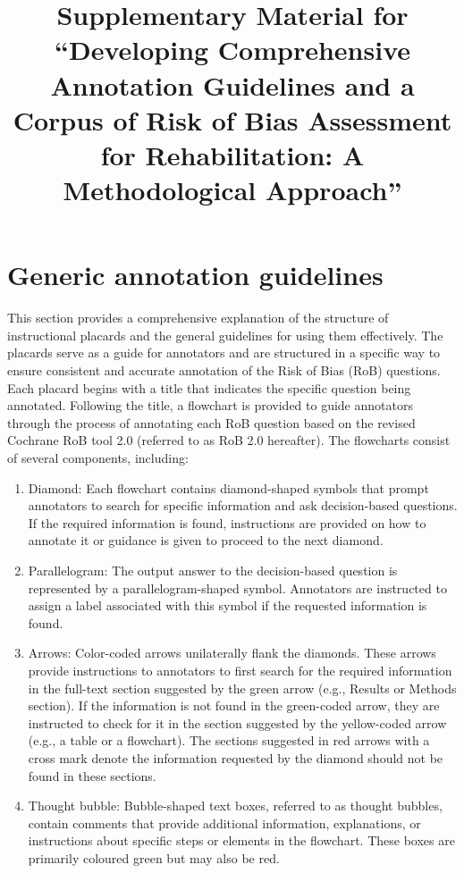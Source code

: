 \documentclass[sn-mathphys,Numbered]{sn-jnl}%
\begin{document}
\title[Article Title]{Supplementary Material for ``Developing Comprehensive Annotation Guidelines and a Corpus of Risk of Bias Assessment for Rehabilitation: A Methodological Approach''}



\maketitle


\section*{Generic annotation guidelines}
\label{sec:generic}
%
This section provides a comprehensive explanation of the structure of instructional placards and the general guidelines for using them effectively.
The placards serve as a guide for annotators and are structured in a specific way to ensure consistent and accurate annotation of the Risk of Bias (RoB) questions.
Each placard begins with a title that indicates the specific question being annotated.
Following the title, a flowchart is provided to guide annotators through the process of annotating each RoB question based on the revised Cochrane RoB tool 2.0 (referred to as RoB 2.0 hereafter).
The flowcharts consist of several components, including:
%
%
%
\begin{enumerate}
    \item Diamond: Each flowchart contains diamond-shaped symbols that prompt annotators to search for specific information and ask decision-based questions. If the required information is found, instructions are provided on how to annotate it or guidance is given to proceed to the next diamond.
    \item Parallelogram: The output answer to the decision-based question is represented by a parallelogram-shaped symbol. Annotators are instructed to assign a label associated with this symbol if the requested information is found.
    \item Arrows: Color-coded arrows unilaterally flank the diamonds. These arrows provide instructions to annotators to first search for the required information in the full-text section suggested by the green arrow (e.g., Results or Methods section). If the information is not found in the green-coded arrow, they are instructed to check for it in the section suggested by the yellow-coded arrow (e.g., a table or a flowchart). The sections suggested in red arrows with a cross mark denote the information requested by the diamond should not be found in these sections.
    \item Thought bubble: Bubble-shaped text boxes, referred to as thought bubbles, contain comments that provide additional information, explanations, or instructions about specific steps or elements in the flowchart. These boxes are primarily coloured green but may also be red.
\end{enumerate}
\end{document}

